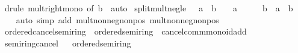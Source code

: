 \begin{isabellebody}
\ {\isacharparenleft}{\kern0pt}drule\ mult{\isacharunderscore}{\kern0pt}right{\isacharunderscore}{\kern0pt}mono\ {\isacharbrackleft}{\kern0pt}of\ b\ {}{\isacharbrackright}{\kern0pt}{\isacharparenright}{\kern0pt}\ auto%
\endisatagproof
{\isafoldproof}%
%
\isadelimproof
\isanewline
%
\endisadelimproof
\isanewline
{}\isamarkupfalse%
\ split{\isacharunderscore}{\kern0pt}mult{\isacharunderscore}{\kern0pt}neg{\isacharunderscore}{\kern0pt}le{\isacharcolon}{\kern0pt}\ {\isachardoublequoteopen}{\isacharparenleft}{\kern0pt}{}\ {\isasymle}\ a\ {\isasymand}\ b\ {\isasymle}\ {}{\isacharparenright}{\kern0pt}\ {\isasymor}\ {\isacharparenleft}{\kern0pt}a\ {\isasymle}\ {}\ {\isasymand}\ {}\ {\isasymle}\ b{\isacharparenright}{\kern0pt}\ {\isasymLongrightarrow}\ a\ {\isacharasterisk}{\kern0pt}\ b\ {\isasymle}\ {}{\isachardoublequoteclose}\isanewline
%
\isadelimproof
\ \ %
\endisadelimproof
%
\isatagproof
{}\isamarkupfalse%
\ {\isacharparenleft}{\kern0pt}auto\ simp\ add{\isacharcolon}{\kern0pt}\ mult{\isacharunderscore}{\kern0pt}nonneg{\isacharunderscore}{\kern0pt}nonpos\ mult{\isacharunderscore}{\kern0pt}nonneg{\isacharunderscore}{\kern0pt}nonpos{}{\isacharparenright}{\kern0pt}%
\endisatagproof
{\isafoldproof}%
%
\isadelimproof
\isanewline
%
\endisadelimproof
\isanewline
{}\isamarkupfalse%
\isanewline
\isanewline
{}\isamarkupfalse%
\ ordered{\isacharunderscore}{\kern0pt}cancel{\isacharunderscore}{\kern0pt}semiring\ {\isacharequal}{\kern0pt}\ ordered{\isacharunderscore}{\kern0pt}semiring\ {\isacharplus}{\kern0pt}\ cancel{\isacharunderscore}{\kern0pt}comm{\isacharunderscore}{\kern0pt}monoid{\isacharunderscore}{\kern0pt}add\isanewline
{}\isanewline
\isanewline
{}\isamarkupfalse%
\ semiring{\isacharunderscore}{\kern0pt}{}{\isacharunderscore}{\kern0pt}cancel%
\isadelimproof
\ %
\endisadelimproof
%
\isatagproof
\isacommand{{\isachardot}{\kern0pt}{\isachardot}{\kern0pt}}\isamarkupfalse%
%
\endisatagproof
{\isafoldproof}%
%
\isadelimproof
%
\endisadelimproof
\isanewline
\isanewline
{}\isamarkupfalse%
\ ordered{\isacharunderscore}{\kern0pt}semiring{\isacharunderscore}{\kern0pt}{}%
\isadelimproof
\ %
\endisadelimproof
%
\isatagproof
\isacommand{{\isachardot}{\kern0pt}{\isachardot}{\kern0pt}}\isamarkupfalse%
%
\endisatagproof
{\isafoldproof}%
%
\isadelimproof
%
\endisadelimproof
\isanewline
\isanewline
{}\isamarkupfalse%
\isanewline
\isanewline
{}\isamarkupfalse%

\end{isabellebody}
